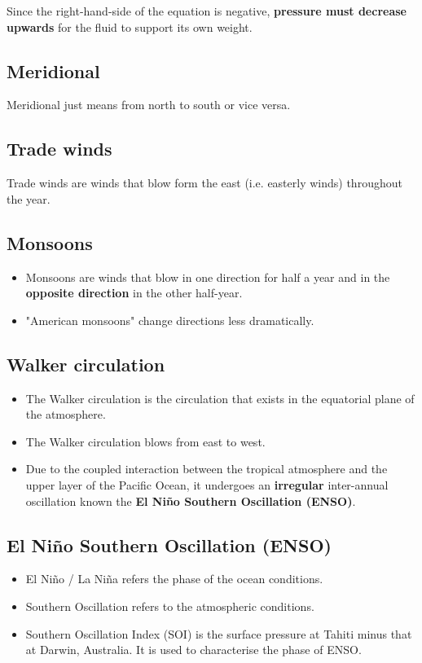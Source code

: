 \documentclass[11pt]{article}
\begin{document}
Since the right-hand-side of the equation is negative, \textbf{pressure must decrease upwards} for the fluid to support its own weight.
\subsection{Meridional}
\label{sec:org5a3647b}
Meridional just means from north to south or vice versa.
\subsection{Trade winds}
\label{sec:org284c707}
Trade winds are winds that blow form the east (i.e. easterly winds) throughout the year.
\subsection{Monsoons}
\label{sec:org2147a03}
\begin{itemize}
\item Monsoons are winds that blow in one direction for half a year and in the \textbf{opposite direction} in the other half-year.
\item "American monsoons" change directions less dramatically.
\end{itemize}
\subsection{Walker circulation}
\label{sec:org9fb31b3}
\begin{itemize}
\item The Walker circulation is the circulation that exists in the equatorial plane of the atmosphere.
\item The Walker circulation blows from east to west.
\item Due to the coupled interaction between the tropical atmosphere and the upper layer of the Pacific Ocean, it undergoes an \textbf{irregular} inter-annual oscillation known the \textbf{El Niño Southern Oscillation (ENSO)}.
\end{itemize}
\subsection{El Niño Southern Oscillation (ENSO)}
\label{sec:org85439d8}
\begin{itemize}
\item El Niño / La Niña refers the phase of the ocean conditions.
\item Southern Oscillation refers to the atmospheric conditions.
\item Southern Oscillation Index (SOI) is the surface pressure at Tahiti minus that at Darwin, Australia. It is used to characterise the phase of ENSO.
\end{itemize}
\end{document}
